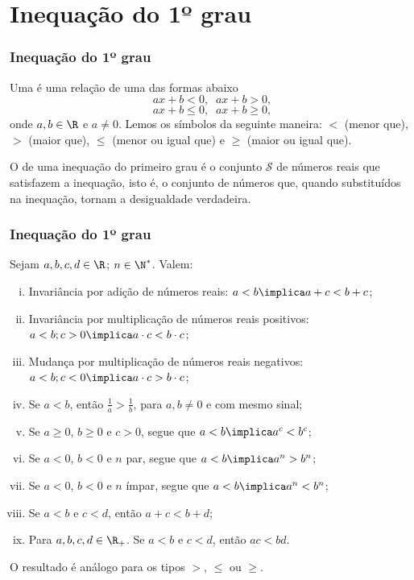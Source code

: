 
\section{Inequação do 1º grau}
\begin{frame}
\frametitle{Inequação do 1º grau} 

\setcounter{teorema}{23}
\begin{definicao}
Uma  é uma relação de uma das formas
abaixo $$ax+b <0, \; \; ax+b>0,$$ $$ax+b \leq 0, \; \; ax+b \geq
0,$$ onde $a, b \in \R$ e $ a \neq 0$. Lemos os símbolos da seguinte
maneira: $<$ (menor que), $>$ (maior que), $\leq$ (menor ou igual
que) e $\geq$ (maior ou igual que).
\end{definicao}

O  de uma inequação do primeiro grau é o
conjunto $\mathcal{S}$ de números reais que satisfazem a inequação,
isto é, o conjunto de números que, quando substituídos na inequação,
tornam a desigualdade verdadeira.

\end{frame}


\begin{frame}
\frametitle{Inequação do 1º grau} 

\begin{proposicao}
Sejam $a, b, c, d \in \R$; $n \in \N^*$. Valem:
\begin{enumerate}[i.]
	\item Invariância por adição de números reais: $a < b \implica a+c < b+c$;
	\item Invariância por multiplicação de números reais positivos:
	$a < b ; c>0 \implica a \cdot c < b \cdot c$;
	\item Mudança por multiplicação de números reais
	negativos: $a < b ; c<0 \implica a \cdot c > b \cdot c$;
	\item Se $a < b$, então $\frac 1 a > \frac 1 b$, para $a, b \neq 0$ e com mesmo sinal;
	\item Se $a \geq 0$, $b \geq 0$ e $c>0$, segue que $a < b \implica a^c < b^c$;
	\item Se $a< 0$, $b < 0$ e $n$ par, segue que $a < b \implica a^n > b^n$;
	\item Se $a<0$, $b < 0$ e $n$ ímpar, segue que $a < b \implica a^n <
	b^n$;
	\item Se $a< b$ e $c< d$, então $a+c < b+d$;
	\item Para $a, b, c, d \in \R_+$. Se $a< b$ e $c< d$, então $ac < bd$.
\end{enumerate}
O resultado é análogo para os tipos $>$, $\leq$ ou $\geq$.
\end{proposicao}


\end{frame}


